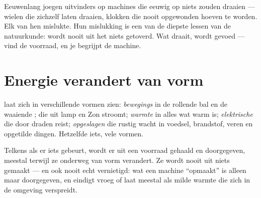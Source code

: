 \begin{remark}\label{rem:g5:everyday-energy:nofree}
Eeuwenlang joegen uitvinders op machines die eeuwig op niets zouden
draaien --- wielen die zichzelf laten draaien, klokken die nooit
opgewonden hoeven te worden. Elk van hen mislukte. Hun mislukking is
een van de diepste lessen van de natuurkunde:  wordt nooit uit
het niets getoverd. Wat draait, wordt gevoed --- vind de voorraad, en
je begrijpt de machine.
\end{remark}

\section{Energie verandert van vorm}

\begin{example}\label{ex:g5:everyday-energy:forms}
 laat zich in verschillende vormen zien:
\emph{bewegings} in de rollende bal en de waaiende
; \emph{} die uit lamp en Zon stroomt;
\emph{warmte} in alles wat warm is;
\emph{elektrische}  die door draden reist; \emph{opgeslagen}
 die rustig wacht in voedsel, brandstof, veren en opgetilde
dingen. Hetzelfde iets, vele vormen.
\end{example}

\begin{proposition}[De energieketen]\label{prop:g5:everyday-energy:chain}
Telkens als er iets gebeurt, wordt er  uit een voorraad gehaald
en doorgegeven, meestal terwijl ze onderweg van vorm verandert. Ze
wordt nooit uit niets gemaakt --- en ook nooit echt vernietigd: wat een
machine ``opmaakt'' is alleen maar doorgegeven, en eindigt vroeg of
laat meestal als milde warmte die zich in de omgeving verspreidt.
\end{proposition}

